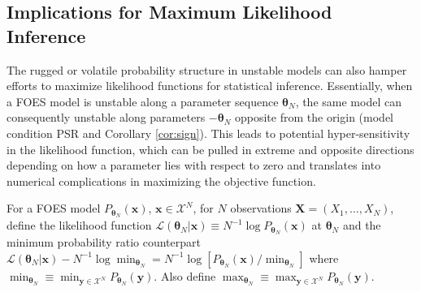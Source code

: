 \documentclass[]{article}
\theoremstyle{definition}
\begin{document}
\subsection{Implications for Maximum Likelihood
Inference}\label{implications-for-maximum-likelihood-inference}

The rugged or volatile probability structure in unstable models can also
hamper efforts to maximize likelihood functions for statistical
inference. Essentially, when a FOES model is unstable along a parameter
sequence \(\boldsymbol \theta_N\), the same model can consequently
unstable along parameters \(-\boldsymbol \theta_N\) opposite from the
origin (model condition PSR and Corollary \ref{cor:sign}). This leads to
potential hyper-sensitivity in the likelihood function, which can be
pulled in extreme and opposite directions depending on how a parameter
lies with respect to zero and translates into numerical complications in
maximizing the objective function.

For a FOES model \(P_{\boldsymbol \theta_N}(\boldsymbol x)\),
\(\boldsymbol x\in\mathcal{X}^N\), for \(N\) observations
\(\boldsymbol X =(X_1,\ldots,X_N)\), define the likelihood function
\(\mathcal{L}(\boldsymbol \theta_N | \boldsymbol x) \equiv N^{-1}\log P_{\boldsymbol \theta_N }(\boldsymbol x)\)
at \(\boldsymbol \theta_N\) and the minimum probability ratio
counterpart
\(\mathcal{L}(\boldsymbol \theta_N | \boldsymbol x) - N^{-1} \log \min_{\boldsymbol \theta_N}= N^{-1}\log[P_{\boldsymbol \theta_N }(\boldsymbol x) /\min_{\boldsymbol \theta_N}]\)
where
\(\min_{\boldsymbol \theta_N} \equiv \min_{\boldsymbol y\in\mathcal{X}^N} P_{\boldsymbol \theta_N }(\boldsymbol y)\).
Also define
\(\max_{\boldsymbol \theta_N} \equiv \max_{\boldsymbol y\in\mathcal{X}^N} P_{\boldsymbol \theta_N }(\boldsymbol y)\).
\end{document}
